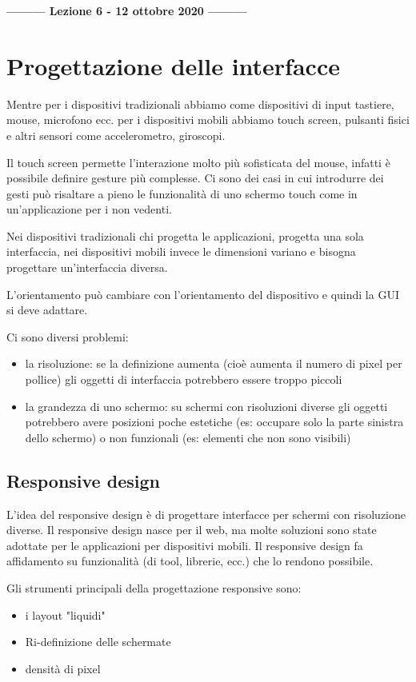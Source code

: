 \begin{center}
    \textbf{--------- Lezione 6 - 12 ottobre 2020 ---------}
\end{center}

\section{Progettazione delle interfacce}
Mentre per i dispositivi tradizionali abbiamo come dispositivi di input tastiere, mouse, microfono ecc. per i dispositivi mobili abbiamo touch screen, pulsanti fisici e altri sensori come accelerometro, giroscopi. 

Il touch screen permette l'interazione molto più sofisticata del mouse, infatti è possibile definire gesture più complesse. 
Ci sono dei casi in cui introdurre dei gesti può risaltare a pieno le funzionalità di uno schermo touch come in un'applicazione per i non vedenti. 

Nei dispositivi tradizionali chi progetta le applicazioni, progetta una sola interfaccia, nei dispositivi mobili invece le dimensioni variano e bisogna progettare un'interfaccia diversa. 

L'orientamento può cambiare con l'orientamento del dispositivo e quindi la GUI si deve adattare. 

Ci sono diversi problemi: 
\begin{itemize}
    \item la risoluzione: se la definizione aumenta (cioè aumenta il numero di pixel per pollice) gli oggetti di interfaccia potrebbero essere troppo piccoli
    \item la grandezza di uno schermo: su schermi con risoluzioni diverse gli oggetti potrebbero avere posizioni poche estetiche (es: occupare solo la parte sinistra dello schermo) o non funzionali (es: elementi che non sono visibili)
\end{itemize}

\subsection{Responsive design}
L'idea del responsive design è di progettare interfacce per schermi con risoluzione diverse. 
Il responsive design nasce per il web, ma molte soluzioni sono state adottate per le applicazioni per dispositivi mobili.
Il responsive design fa affidamento su funzionalità (di tool, librerie, ecc.) che lo rendono possibile. 

Gli strumenti principali della progettazione responsive sono:
\begin{itemize}
    \item i layout "liquidi"
    \item Ri-definizione delle schermate
    \item densità di pixel
\end{itemize}

